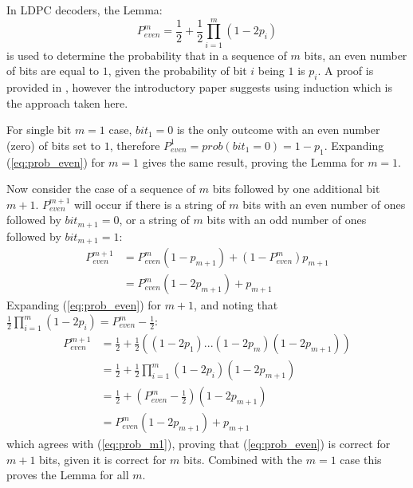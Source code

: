 \documentclass{article}
\begin{document}
In LDPC decoders, the Lemma:
\begin{equation} \label{eq:prob_even}
P_{even}^{m}=\frac{1}{2}+\frac{1}{2}\prod_{i=1}^{m}(1-2p_{i})
\end{equation}
is used to determine the probability that in a sequence of $m$ bits, an even number of bits are equal to $1$, given the probability of bit $i$ being $1$ is $p_i$.  A proof is provided in \cite{gallager1963low}, however the introductory paper \cite{ryan2004introduction} suggests using induction which is the approach taken here.

For single bit $m=1$ case, $bit_{1}=0$ is the only outcome with an even number (zero) of bits set to $1$, therefore $P_{even}^{1}=prob(bit_{1}=0)=1-p_{1}$.  Expanding (\ref{eq:prob_even}) for $m=1$ gives the same result, proving the Lemma for $m=1$.

Now consider the case of a sequence of $m$ bits followed by one additional bit $m+1$.  $P_{even}^{m+1}$ will occur if there is a string of $m$ bits with an even number of ones followed by $bit_{m+1}=0$, or a string of $m$ bits with an odd number of ones followed by $bit_{m+1}=1$:
\begin{equation} \label{eq:prob_m1}
\begin{split}
P_{even}^{m+1}&=P_{even}^{m}(1-p_{m+1})+(1-P_{even}^{m})p_{m+1} \\
&=P_{even}^{m}(1-2p_{m+1})+p_{m+1}
\end{split}
\end{equation}
Expanding (\ref{eq:prob_even}) for $m+1$, and noting that $\frac{1}{2}\prod_{i=1}^{m}(1-2p_{i})=P_{even}^{m}-\frac{1}{2}$:
\begin{equation}
\begin{split}
P_{even}^{m+1}&=\frac{1}{2}+\frac{1}{2}((1-2p_{1})...(1-2p_{m})(1-2p_{m+1})) \\
&=\frac{1}{2}+\frac{1}{2}\prod_{i=1}^{m}(1-2p_{i})(1-2p_{m+1}) \\
&=\frac{1}{2}+(P_{even}^{m}-\frac{1}{2})(1-2p_{m+1}) \\
&=P_{even}^{m}(1-2p_{m+1})+p_{m+1}
\end{split}
\end{equation}
which agrees with (\ref{eq:prob_m1}), proving that (\ref{eq:prob_even}) is correct for $m+1$ bits, given it is correct for $m$ bits.  Combined with the $m=1$ case this proves the Lemma for all $m$.



\end{document}
